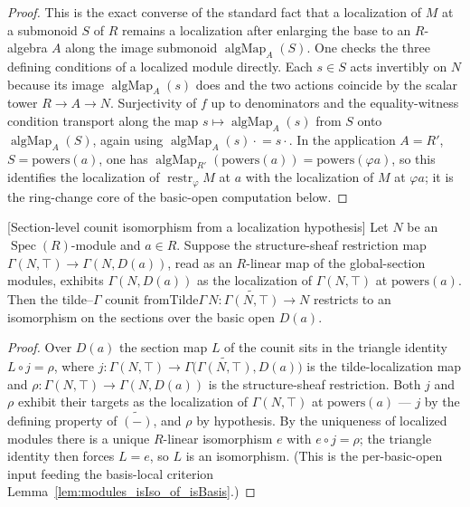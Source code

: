 \begin{proof}



  This is the exact converse of the standard fact that a localization of \(M\) at a
  submonoid \(S\) of \(R\) remains a localization after enlarging the base to an
  \(R\)-algebra \(A\) along the image submonoid \(\operatorname{algMap}_A(S)\). One
  checks the three defining conditions of a localized module directly. Each
  \(s \in S\) acts invertibly on \(N\) because its image
  \(\operatorname{algMap}_A(s)\) does and the two actions coincide by the scalar
  tower \(R \to A \to N\). Surjectivity of \(f\) up to denominators and the
  equality-witness condition transport along the map
  \(s \mapsto \operatorname{algMap}_A(s)\) from \(S\) onto
  \(\operatorname{algMap}_A(S)\), again using
  \(\operatorname{algMap}_A(s)\cdot{} = s\cdot{}\). In the application
  \(A = R'\), \(S = \mathrm{powers}(a)\), one has
  \(\operatorname{algMap}_{R'}(\mathrm{powers}(a)) = \mathrm{powers}(\varphi a)\), so
  this identifies the localization of \(\operatorname{restr}_\varphi M\) at \(a\)
  with the localization of \(M\) at \(\varphi a\); it is the ring-change core of the
  basic-open computation below.
\end{proof}

\begin{lemma}


[Section-level counit isomorphism from a localization hypothesis]
  \label{lem:fromTildeGamma_app_isIso_of_localized}
  Let \(N\) be an \(\operatorname{Spec}(R)\)-module and \(a \in R\). Suppose the
  structure-sheaf restriction map \(\Gamma(N, \top) \to \Gamma(N, D(a))\), read as
  an \(R\)-linear map of the global-section modules, exhibits \(\Gamma(N, D(a))\) as
  the localization of \(\Gamma(N, \top)\) at \(\mathrm{powers}(a)\). Then the
  tilde--\(\Gamma\) counit
  \(\mathrm{fromTilde}\Gamma\,N : \widetilde{\Gamma(N,\top)} \to N\) restricts to an
  isomorphism on the sections over the basic open \(D(a)\).
\end{lemma}

\begin{proof}



  Over \(D(a)\) the section map \(L\) of the counit sits in the triangle identity
  \(L \circ j = \rho\), where
  \(j : \Gamma(N,\top) \to \Gamma\bigl(\widetilde{\Gamma(N,\top)}, D(a)\bigr)\) is
  the tilde-localization map and \(\rho : \Gamma(N,\top) \to \Gamma(N, D(a))\) is
  the structure-sheaf restriction. Both \(j\) and \(\rho\) exhibit their targets as
  the localization of \(\Gamma(N,\top)\) at \(\mathrm{powers}(a)\) — \(j\) by the
  defining property of \(\widetilde{(-)}\), and \(\rho\) by hypothesis. By the
  uniqueness of localized modules there is a unique \(R\)-linear isomorphism \(e\)
  with \(e \circ j = \rho\); the triangle identity then forces \(L = e\), so \(L\) is
  an isomorphism. (This is the per-basic-open input feeding the basis-local
  criterion Lemma~\ref{lem:modules_isIso_of_isBasis}.)
\end{proof}

